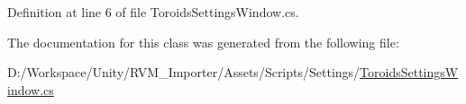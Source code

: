 Definition at line 6 of file Toroids\+Settings\+Window.\+cs.



The documentation for this class was generated from the following file\+:\begin{DoxyCompactItemize}
\item 
D\+:/\+Workspace/\+Unity/\+R\+V\+M\+\_\+\+Importer/\+Assets/\+Scripts/\+Settings/\mbox{\hyperlink{_toroids_settings_window_8cs}{Toroids\+Settings\+Window.\+cs}}\end{DoxyCompactItemize}
